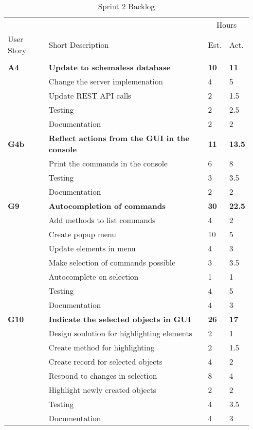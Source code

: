 \begin{table}
\caption{Sprint 2 Backlog}
\centering
\begin{tabular}{ l p{8cm} l l }
\hline 
			&				&\multicolumn{2}{c}{Hours}			\\
 User Story	& Short Description		&Est.		&Act.	                               \\ 
\hline \\ [-2.0ex]
 \bf{A4}     &\bf{Update to schemaless database}		&\bf{10}		&\bf{11}          \\ 
		  &Change the server implemenation		&4			&5		\\
		  &Update REST API calls					&2			&1.5		\\
		  &Testing							&2			&2.5		\\
		  &Documentation						&2			&2		\\

 \bf{G4b}     &\bf{Reflect actions from the GUI in the console} 		&\bf{11}		&\bf{13.5}               \\ 
		  &Print the commands in the console				&6			&8		\\
		  &Testing									&3			&3.5		\\
		  &Documentation								&2			&2		\\

 \bf{G9}     &\bf{Autocompletion of commands} 	&\bf{30}		&\bf{22.5}		     \\ 
		  &Add methods to list commands		&4			&2		\\
		  &Create popup menu				&10			&5		\\
		  &Update elements in menu			&4			&3		\\
		  &Make selection of commands possible&3			&3.5		\\
		  &Autocomplete on selection			&1			&1		\\
		  &Testing						&4			&5		\\
		  &Documentation					&4			&3		\\

 \bf{G10}   &\bf{Indicate the selected objects in GUI}		&\bf{26}		&\bf{17}		     \\ 
		  &Design soulution for highlighting elements	&2			&1		\\
		  &Create method for highlighting				&2			&1.5		\\
		  &Create record for selected objects			&4			&2		\\
		  &Respond to changes in selection				&8			&4		\\
		  &Highlight newly created objects				&2			&2		\\
		  &Testing								&4			&3.5		\\
		  &Documentation							&4			&3		\\


\end{tabular}
\end{table}
